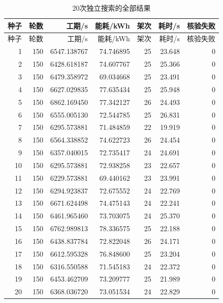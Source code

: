 \begin{longtable}{@{}rrrrrrr@{}}
\caption{20次独立搜索的全部结果}\label{tab:app_seeds}\\
\toprule
种子 & 轮数 & 工期/s & 能耗/kWh & 架次 & 耗时/s & 核验失败\\
\midrule
\endfirsthead
\toprule
种子 & 轮数 & 工期/s & 能耗/kWh & 架次 & 耗时/s & 核验失败\\
\midrule
\endhead
1 & 150 & 6547.138767 & 74.746895 & 25 & 23.648 & 0\\
2 & 150 & 6428.618187 & 74.607767 & 25 & 25.366 & 0\\
3 & 150 & 6479.358972 & 69.034668 & 25 & 23.491 & 0\\
4 & 150 & 6627.029835 & 77.635434 & 25 & 25.948 & 0\\
5 & 150 & 6862.169450 & 77.342127 & 26 & 24.493 & 0\\
6 & 150 & 6555.005130 & 72.544785 & 25 & 26.831 & 0\\
7 & 150 & 6295.573881 & 71.484859 & 22 & 19.919 & 0\\
8 & 150 & 6564.338852 & 74.622723 & 26 & 24.454 & 0\\
9 & 150 & 6357.040015 & 72.735417 & 24 & 24.691 & 0\\
10 & 150 & 6295.573881 & 72.938258 & 23 & 22.657 & 0\\
11 & 150 & 6229.573881 & 69.440162 & 23 & 23.991 & 0\\
12 & 150 & 6294.923837 & 72.675552 & 24 & 22.769 & 0\\
13 & 150 & 6671.624498 & 74.475143 & 24 & 22.241 & 0\\
14 & 150 & 6461.965460 & 73.703075 & 24 & 25.370 & 0\\
15 & 150 & 6762.989813 & 78.336575 & 25 & 22.188 & 0\\
16 & 150 & 6438.837784 & 72.822048 & 26 & 24.171 & 0\\
17 & 150 & 6612.595328 & 76.848600 & 25 & 23.204 & 0\\
18 & 150 & 6316.550588 & 71.545183 & 24 & 22.372 & 0\\
19 & 150 & 6453.462709 & 73.209777 & 25 & 21.989 & 0\\
20 & 150 & 6368.036720 & 73.051534 & 24 & 22.829 & 0\\
\bottomrule
\end{longtable}
